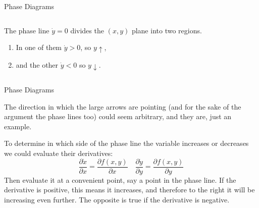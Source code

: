 \documentclass[aspectratio=169, handout]{beamer}
\begin{document}
\begin{frame}{Phase Diagrams}
    \begin{columns}
        \begin{column}{0.47\textwidth}
            The phase line $\dot{y}=0$ divides the $(x,y)$ plane into two regions.
            \begin{enumerate}
                \item In one of them $\dot{y}>0$, so $y\uparrow$,
                \item and the other $\dot{y}<0$ so $y\downarrow$.
            \end{enumerate}
        \end{column}

        \begin{column}{0.47\textwidth}
            \begin{center}
            \end{center}
        \end{column}
    \end{columns}
\end{frame}

\begin{frame}{Phase Diagrams}
    
    The direction in which the large arrows are pointing (and for the sake of the argument the phase lines too) could seem arbitrary, and they are, just an example.\pause
    
    To determine in which side of the phase line the variable increases or decreases we could evaluate their derivatives:
    \[\frac{\partial\dot{x}}{\partial x}=\frac{\partial f(x,y)}{\partial x}\quad \frac{\partial\dot{y}}{\partial y}=\frac{\partial f(x,y)}{\partial y}\]
    Then evaluate it at a convenient point, say a point in the phase line. If the derivative is positive, this means it increases, and therefore to the right it will be increasing even further. The opposite is true if the derivative is negative.
\end{frame}
\end{document}
